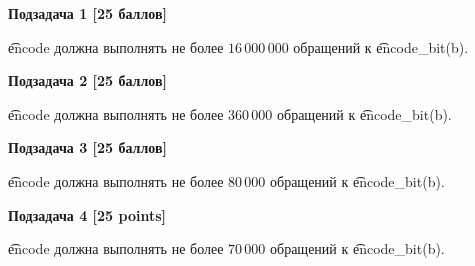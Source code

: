 {\bf Подзадача 1 [25 баллов]}

\t{encode} должна выполнять не более $16\,000\,000$ обращений к \t{encode\_bit(b)}.

{\bf Подзадача 2 [25 баллов]}

\t{encode} должна выполнять не более $360\,000$ обращений к \t{encode\_bit(b)}.

{\bf Подзадача 3 [25 баллов]}

\t{encode} должна выполнять не более $80\,000$ обращений к \t{encode\_bit(b)}.

{\bf Подзадача 4 [25 points]}

\t{encode} должна выполнять не более $70\,000$ обращений к \t{encode\_bit(b)}.
